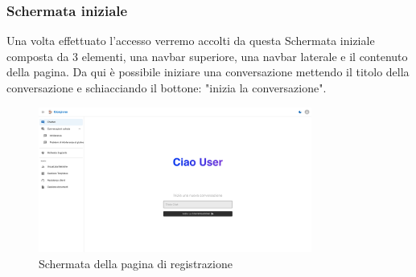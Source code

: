 \subsubsection{Schermata iniziale}
Una volta effettuato l'accesso verremo accolti da questa Schermata iniziale composta da 3 elementi, una navbar superiore, una navbar laterale e il contenuto della pagina. Da qui è possibile iniziare una conversazione mettendo il titolo della conversazione e schiacciando il bottone: "inizia la conversazione".
\begin{figure}[h!]
    \centering
    \includegraphics[width=0.8\textwidth]{./img/paginaIniziale.png}
    \caption{Schermata della pagina di registrazione}
\end{figure}

